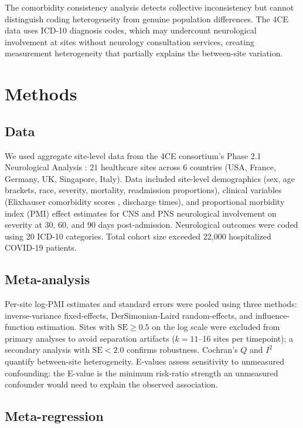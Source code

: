 \documentclass{article}
\begin{document}
The comorbidity consistency analysis detects collective inconsistency but cannot distinguish coding heterogeneity from genuine population differences.
The 4CE data uses ICD-10 diagnosis codes, which may undercount neurological involvement at sites without neurology consultation services, creating measurement heterogeneity that partially explains the between-site variation.


\section{Methods}

\subsection{Data}

We used aggregate site-level data from the 4CE consortium's Phase 2.1 Neurological Analysis \cite{four_ce_neuro2021, chou20224ce}: 21 healthcare sites across 6 countries (USA, France, Germany, UK, Singapore, Italy).
Data included site-level demographics (sex, age brackets, race, severity, mortality, readmission proportions), clinical variables (Elixhauser comorbidity scores \cite{elixhauser1998}, discharge times), and proportional morbidity index (PMI) effect estimates for CNS and PNS neurological involvement on severity at 30, 60, and 90 days post-admission.
Neurological outcomes were coded using 20 ICD-10 categories.
Total cohort size exceeded 22,000 hospitalized COVID-19 patients.

\subsection{Meta-analysis}

Per-site log-PMI estimates and standard errors were pooled using three methods: inverse-variance fixed-effects, DerSimonian-Laird random-effects, and influence-function estimation.
Sites with $\text{SE} \geq 0.5$ on the log scale were excluded from primary analyses to avoid separation artifacts ($k = 11$--16 sites per timepoint); a secondary analysis with $\text{SE} < 2.0$ confirms robustness.
Cochran's $Q$ and $I^2$ quantify between-site heterogeneity.
E-values \cite{vanderweele2017} assess sensitivity to unmeasured confounding: the E-value is the minimum risk-ratio strength an unmeasured confounder would need to explain the observed association.

\subsection{Meta-regression}
\end{document}
